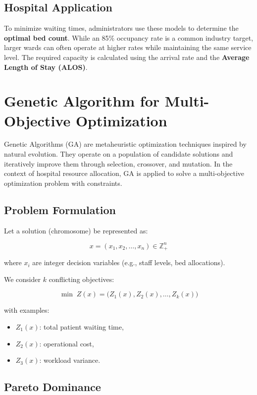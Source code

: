 \documentclass[12pt,a4paper]{article}
\begin{document}
	
	\subsection*{Hospital Application}
	To minimize waiting times, administrators use these models to determine the \textbf{optimal bed count}. While an 85\% occupancy rate is a common industry target, larger wards can often operate at higher rates while maintaining the same service level. The required capacity is calculated using the arrival rate and the \textbf{Average Length of Stay (ALOS)}.
	
	
	\section{Genetic Algorithm for Multi-Objective Optimization}
	
	Genetic Algorithms (GA) are metaheuristic optimization techniques inspired by natural evolution. 
	They operate on a population of candidate solutions and iteratively improve them through 
	selection, crossover, and mutation. In the context of hospital resource allocation, GA is applied 
	to solve a multi-objective optimization problem with constraints.
	
	\subsection{Problem Formulation}
	
	Let a solution (chromosome) be represented as:
	
	
	\[
	x = (x_1, x_2, \dots, x_n) \in \mathbb{Z}_+^n
	\]
	
	
	where $x_i$ are integer decision variables (e.g., staff levels, bed allocations).
	
	We consider $k$ conflicting objectives:
	
	
	\[
	\min \; Z(x) = \big(Z_1(x), Z_2(x), \dots, Z_k(x)\big)
	\]
	
	
	with examples:
	\begin{itemize}
		\item $Z_1(x)$: total patient waiting time,
		\item $Z_2(x)$: operational cost,
		\item $Z_3(x)$: workload variance.
	\end{itemize}
	
	\subsection{Pareto Dominance}
	
\end{document}
